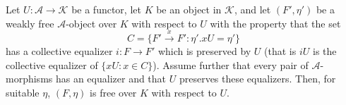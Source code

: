 Let $U: \mathcal{A} \longrightarrow \mathcal{K}$ be a functor, let $K$ be an object in $\mathcal{K}$, and let $(F', \eta')$ be a weakly free $\mathcal{A}$-object over $K$ with respect to $U$ with the property that the set
$$C = \{F' \xrightarrow{x} F': \eta'.xU = \eta'\}$$
has a collective equalizer $i: F \longrightarrow F'$ which is preserved by $U$ (that is $iU$ is the collective equalizer of $\{xU: x \in C\}$). Assume further that every pair of $\mathcal{A}$-morphisms has an equalizer and that $U$ preserves these equalizers. Then, for suitable $\eta$, $(F, \eta)$ is free over $K$ with respect to $U$.
